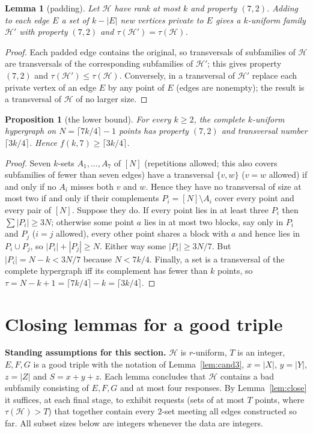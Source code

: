 \documentclass[11pt]{amsart}
\newtheorem{lemma}[theorem]{Lemma}
\newtheorem{proposition}[theorem]{Proposition}
\theoremstyle{definition}
\theoremstyle{remark}
\newcommand{\cH}{\mathcal H}
\newcommand{\ceil}[1]{\lceil #1\rceil}
\begin{document}
\begin{lemma}[padding]\label{lem:pad}
Let $\cH$ have rank at most $k$ and property $(7,2)$. Adding to each edge $E$ a set of $k-|E|$ new vertices private to $E$ gives a $k$-uniform family $\cH'$ with property $(7,2)$ and $\tau(\cH')=\tau(\cH)$.
\end{lemma}
\begin{proof}
Each padded edge contains the original, so transversals of subfamilies of $\cH$ are transversals of the corresponding subfamilies of $\cH'$; this gives property $(7,2)$ and $\tau(\cH')\le\tau(\cH)$. Conversely, in a transversal of $\cH'$ replace each private vertex of an edge $E$ by any point of $E$ (edges are nonempty); the result is a transversal of $\cH$ of no larger size.
\end{proof}

\begin{proposition}[the lower bound]\label{prop:lower}
For every $k\ge2$, the complete $k$-uniform hypergraph on $N=\ceil{7k/4}-1$ points has property $(7,2)$ and transversal number $\ceil{3k/4}$. Hence $f(k,7)\ge\ceil{3k/4}$.
\end{proposition}
\begin{proof}
Seven $k$-sets $A_1,\dots,A_7$ of $[N]$ (repetitions allowed; this also covers subfamilies of fewer than seven edges) have a transversal $\{v,w\}$ ($v=w$ allowed) if and only if no $A_i$ misses both $v$ and $w$. Hence they have no transversal of size at most two if and only if their complements $P_i=[N]\setminus A_i$ cover every point and every pair of $[N]$. Suppose they do. If every point lies in at least three $P_i$ then $\sum|P_i|\ge3N$; otherwise some point $a$ lies in at most two blocks, say only in $P_i$ and $P_j$ ($i=j$ allowed), every other point shares a block with $a$ and hence lies in $P_i\cup P_j$, so $|P_i|+|P_j|\ge N$. Either way some $|P_i|\ge3N/7$. But $|P_i|=N-k<3N/7$ because $N<7k/4$. Finally, a set is a transversal of the complete hypergraph iff its complement has fewer than $k$ points, so $\tau=N-k+1=\ceil{7k/4}-k=\ceil{3k/4}$.
\end{proof}

\section{Closing lemmas for a good triple}\label{sec:closing}

\noindent\textbf{Standing assumptions for this section.} $\cH$ is $r$-uniform, $T$ is an integer, $E,F,G$ is a good triple with the notation of Lemma~\ref{lem:cand3}, $x=|X|$, $y=|Y|$, $z=|Z|$ and $S=x+y+z$. Each lemma concludes that $\cH$ contains a bad subfamily consisting of $E,F,G$ and at most four responses. By Lemma~\ref{lem:close} it suffices, at each final stage, to exhibit requests (sets of at most $T$ points, where $\tau(\cH)>T$) that together contain every $2$-set meeting all edges constructed so far. All subset sizes below are integers whenever the data are integers.
\end{document}
